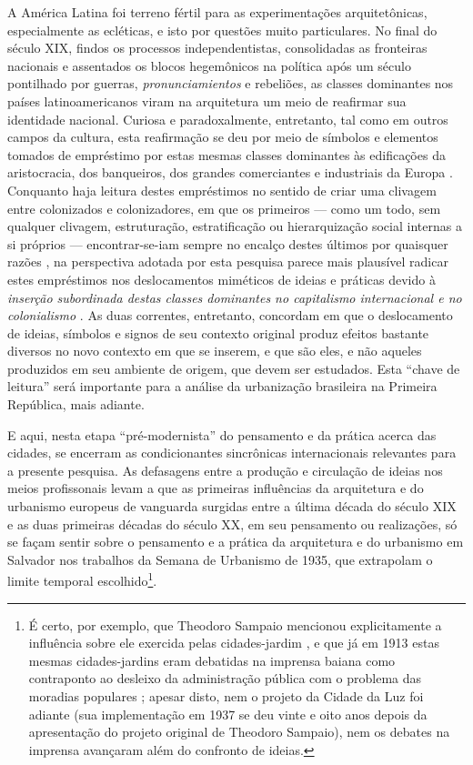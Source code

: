 A América Latina foi terreno fértil para as experimentações arquitetônicas, especialmente as ecléticas, e isto por questões muito particulares. No final do século XIX, findos os processos independentistas, consolidadas as fronteiras nacionais e assentados os blocos hegemônicos na política após um século pontilhado por guerras, \textit{pronunciamientos} e rebeliões, as classes dominantes nos países latinoamericanos viram na arquitetura um meio de reafirmar sua identidade nacional. Curiosa e paradoxalmente, entretanto, tal como em outros campos da cultura, esta reafirmação se deu por meio de símbolos e elementos tomados de empréstimo por estas mesmas classes dominantes às edificações da aristocracia, dos banqueiros, dos grandes comerciantes e industriais da Europa \cite[pp.~403-406]{gutierrez_arquibero_1983}. Conquanto haja leitura destes empréstimos no sentido de criar uma clivagem entre colonizados e colonizadores, em que os primeiros --- como um todo, sem qualquer clivagem, estruturação, estratificação ou hierarquização social internas a si próprios --- encontrar-se-iam sempre no encalço destes últimos por quaisquer razões \cite{bhabha_local_1998,memmi_coloniza_1967}, na perspectiva adotada por esta pesquisa parece mais plausível radicar estes empréstimos nos deslocamentos miméticos de ideias e práticas devido à \textit{inserção subordinada destas classes dominantes no capitalismo internacional e no colonialismo} \cite{schwarz_ideias_1973}. As duas correntes, entretanto, concordam em que o deslocamento de ideias, símbolos e signos de seu contexto original produz efeitos bastante diversos no novo contexto em que se inserem, e que são eles, e não aqueles produzidos em seu ambiente de origem, que devem ser estudados. Esta ``chave de leitura'' será importante para a análise da urbanização brasileira na Primeira República, mais adiante.

E aqui, nesta etapa ``pré-modernista'' do pensamento e da prática acerca das cidades, se encerram as condicionantes sincrônicas internacionais relevantes para a presente pesquisa. As defasagens entre a produção e circulação de ideias nos meios profissonais levam a que as primeiras influências da arquitetura e do urbanismo europeus de vanguarda surgidas entre a última década do século XIX e as duas primeiras décadas do século XX, em seu pensamento ou realizações, só se façam sentir sobre o pensamento e a prática da arquitetura e do urbanismo em Salvador nos trabalhos da Semana de Urbanismo de 1935, que extrapolam o limite temporal escolhido\footnote{É certo, por exemplo, que Theodoro Sampaio mencionou explicitamente a influência sobre ele exercida pelas cidades-jardim \cite{costa1996theodoro}, e que já em 1913 estas mesmas cidades-jardins eram debatidas na imprensa baiana como contraponto ao desleixo da administração pública com o problema das moradias populares \cite{flexor_salvadorverde_2000}; apesar disto, nem o projeto da Cidade da Luz foi adiante (sua implementação em 1937 se deu vinte e oito anos depois da apresentação do projeto original de Theodoro Sampaio), nem os debates na imprensa avançaram além do confronto de ideias.}.
